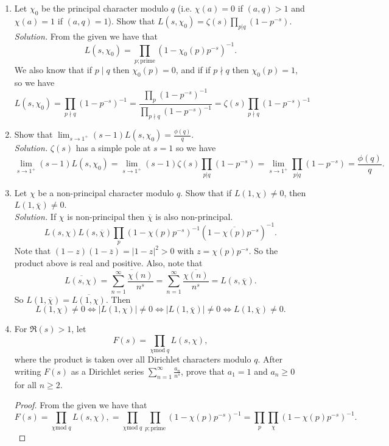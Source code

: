 \documentclass[12pt]{article}
\begin{document}
\begin{enumerate}[label=(\alph*)]
    \item Let $\chi_0$ be the principal character modulo $q$ (i.e. $\chi(a)=0$ if $(a,q)>1$ and $\chi(a)=1$ if $(a,q)=1$). Show that $L(s,\chi_0)=\zeta(s)\prod_{p|q}(1-p^{-s})$.\\
    \textit{Solution.} From the given we have that
    \[
        L(s,\chi_0)=\prod_{p;\text{prime}}(1-\chi_0(p)p^{-s})^{-1}.
    \]
    We also know that if $p\mid q$ then $\chi_0(p)=0$, and if if $p\nmid q$ then $\chi_0(p)=1$, so we have
    \[
        L(s,\chi_0)=\prod_{p\nmid q}(1-p^{-s})^{-1}=\frac{\prod_{p}(1-p^{-s})^{-1}}{\prod_{p\nmid q}(1-p^{-s})^{-1}}=\zeta(s)\prod_{p\nmid q}(1-p^{-s})^{-1}
    \]
    \item Show that $\lim_{s\to1^{+}}(s-1)L(s,\chi_0)=\frac{\phi(q)}{q}$.\\
    \textit{Solution.} $\zeta(s)$ has a simple pole at $s=1$ so we have
    \[
        \lim_{s\to1^{+}}(s-1)L(s,\chi_0)=\lim_{s\to1^{+}}(s-1)\zeta(s)\prod_{p|q}(1-p^{-s})=\lim_{s\to1^{+}}\prod_{p|q}(1-p^{-s})=\frac{\phi(q)}{q}.
    \]
    \item Let $\chi$ be a non-principal character modulo $q$. Show that if $L(1,\chi)\neq0$, then $L(1,\overline{\chi})\neq0$.\\
    \textit{Solution.} If $\chi$ is non-principal then $\overline{\chi}$ is also non-principal. 
    \[
        L(s,\chi)L(s,\overline{\chi})\prod_{p}(1-\chi(p)p^{-s})^{-1}(1-\overline{\chi(p)}p^{-s})^{-1}.
    \]
    Note that $(1-z)(1-\overline{z})=|1-z|^2>0$ with $z=\chi(p)p^{-s}$. So the product above is real and positive. Also, note that
    \[
        \overline{L(s,\chi)}=\overline{\sum_{n=1}^{\infty}\frac{\chi(n)}{n^s}}=\sum_{n=1}^{\infty}\frac{\overline{\chi(n)}}{n^s}=L(s,\overline{\chi}).
    \]
    So $L(1,\overline{\chi})=\overline{L(1,\chi)}$. Then
    \[
        L(1,\chi)\neq0\Leftrightarrow |L(1,\chi)|\neq0\Leftrightarrow|L(1,\overline{\chi})|\neq0\Leftrightarrow L(1,\overline{\chi})\neq0.
    \]
    \item For $\Re(s)>1$, let 
    \[
        F(s)=\prod_{\chi\text{mod}\;q}L(s,\chi),
    \] 
    where the product is taken over all Dirichlet characters modulo $q$. After writing $F(s)$ as a Dirichlet series $\sum_{n=1}^{\infty}\frac{a_n}{n^s}$, prove that $a_1=1$ and $a_n\geq0$ for all $n\geq2$.
    \begin{proof}
        From the given we have that
        \[
            F(s)=\prod_{\chi\text{mod}\;q}L(s,\chi),=\prod_{\chi\text{mod}\;q}\prod_{p;\text{prime}}(1-\chi(p)p^{-s})^{-1}=\prod_{p}\prod_{\chi}(1-\chi(p)p^{-s})^{-1}.
\]
\end{proof}
\end{enumerate}
\end{document}
